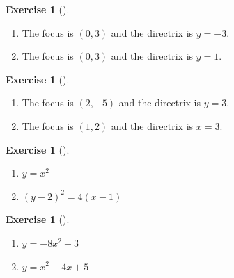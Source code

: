 \documentclass[10pt,]{book}
\theoremstyle{plain}
\theoremstyle{definition}
\theoremstyle{definition}
\theoremstyle{definition}
\theoremstyle{definition}
\newtheorem{exploration}[project]{Exercise}
\theoremstyle{definition}
\numberwithin{equation}{section}
\begin{document}
\begin{exploration}[]\label{exploration-57}
\leavevmode%
\begin{enumerate}[font=\bfseries,label=(\alph*),ref=\alph*]
\item\label{task-93} The focus is \((0,3)\) and the directrix is \(y=-3\).%
\item\label{task-94} The focus is \((0,3)\) and the directrix is \(y=1\).%
\end{enumerate}
\end{exploration}
\begin{exploration}[]\label{exploration-58}
\leavevmode%
\begin{enumerate}[font=\bfseries,label=(\alph*),ref=\alph*]
\item\label{task-95} The focus is \((2,-5)\) and the directrix is \(y=3\).%
\item\label{task-96} The focus is \((1,2)\) and the directrix is \(x=3\).%
\end{enumerate}
\end{exploration}
\begin{exploration}[]\label{exploration-59}
\leavevmode%
\begin{enumerate}[font=\bfseries,label=(\alph*),ref=\alph*]
\item\label{task-97} \(y=x^2\)%
\item\label{task-98} \((y-2)^2=4(x-1)\)%
\end{enumerate}
\end{exploration}
\begin{exploration}[]\label{exploration-60}
\leavevmode%
\begin{enumerate}[font=\bfseries,label=(\alph*),ref=\alph*]
\item\label{task-99} \(y=-8x^2+3\)%
\item\label{task-100} \(y=x^2-4x+5\)%
\end{enumerate}
\end{exploration}
\typeout{************************************************}
\typeout{************************************************}
\end{document}
